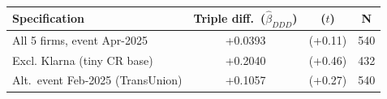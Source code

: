 \begin{tabular}{lccc}
\toprule
Specification & Triple diff.\ ($\hat\beta_{DDD}$) & ($t$) & N \\
\midrule
All 5 firms, event Apr-2025 & +0.0393 & (+0.11) & 540 \\
Excl. Klarna (tiny CR base) & +0.2040 & (+0.46) & 432 \\
Alt.\ event Feb-2025 (TransUnion) & +0.1057 & (+0.27) & 540 \\
\bottomrule
\end{tabular}